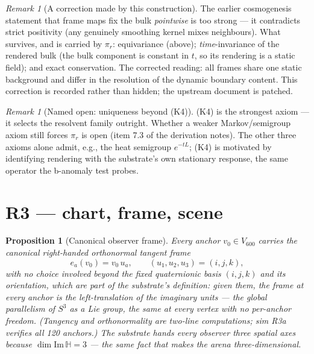 \documentclass[12pt]{article}
\newtheorem{proposition}[theorem]{Proposition}
\theoremstyle{definition}
\theoremstyle{remark}
\newtheorem{remark}[theorem]{Remark}
\newcommand{\Hq}{\mathbb{H}}
\newcommand{\Vsix}{V_{600}}
\begin{document}
\begin{remark}[A correction made by this construction]\label{rem:correction}
The earlier cosmogenesis statement that frame maps fix the bulk \emph{pointwise} is too strong --- it contradicts strict positivity (any genuinely smoothing kernel mixes neighbours). What survives, and is carried by $\pi_r$: equivariance (above); \emph{time}-invariance of the rendered bulk (the bulk component is constant in $t$, so its rendering is a static field); and exact conservation. The corrected reading: all frames share one static background and differ in the resolution of the dynamic boundary content. This correction is recorded rather than hidden; the upstream document is patched.
\end{remark}

\begin{remark}[Named open: uniqueness beyond (K4)]
(K4) is the strongest axiom --- it selects the resolvent family outright. Whether a weaker Markov/semigroup axiom still forces $\pi_r$ is open (item 7.3 of the derivation notes). The other three axioms alone admit, e.g., the heat semigroup $e^{-tL}$; (K4) is motivated by identifying rendering with the substrate's own stationary response, the same operator the b-anomaly test probes.
\end{remark}

\section{R3 --- chart, frame, scene}\label{sec:chart}

\begin{proposition}[Canonical observer frame]\label{prop:frame}
Every anchor $v_0 \in \Vsix$ carries the canonical right-handed orthonormal tangent frame
$$e_a(v_0) = v_0\,u_a, \qquad (u_1,u_2,u_3) = (i,j,k),$$
with no choice involved beyond the fixed quaternionic basis $(i,j,k)$ and its orientation, which are part of the substrate's definition: given them, the frame at every anchor is the left-translation of the imaginary units --- the global parallelism of $S^3$ as a Lie group, the same at every vertex with no per-anchor freedom. (Tangency and orthonormality are two-line computations; sim R3a verifies all 120 anchors.) The substrate hands every observer three spatial axes because $\dim\mathrm{Im}\,\Hq = 3$ --- the same fact that makes the arena three-dimensional.
\end{proposition}
\end{document}
